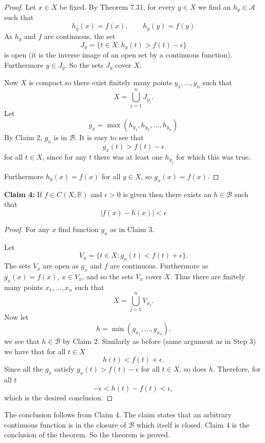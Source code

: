 \documentclass[12pt]{book}
\newcommand{\abs}[1]{\left\lvert {#1} \right\rvert}
\newcommand{\R}{{\mathbb{R}}}
\newcommand{\sA}{{\mathcal{A}}}
\newcommand{\sB}{{\mathcal{B}}}
\theoremstyle{plain}
\theoremstyle{remark}
\theoremstyle{definition}
\theoremstyle{exercise}
\theoremstyle{example}
\begin{document}
\begin{proof}
Let $x \in X$ be fixed.
By Theorem 7.31, for every $y \in X$ we find an $h_y \in
\sA$ such that
$$
h_y(x) = f(x), \qquad h_y(y)=f(y)
$$
As $h_y$ and $f$ are continuous, the set
$$
J_y = \{ t \in X : h_y(t) > f(t) -\epsilon \}
$$
is open (it is the inverse image of an open set by a continuous function).
Furthermore $y \in J_y$.  So the sets $J_y$ cover $X$.

Now $X$ is compact so there exist finitely many points $y_1,\ldots,y_n$ such
that
$$
X = \bigcup_{j=1}^n J_{y_j}  .
$$
Let 
$$
g_x = \max(h_{y_1},h_{y_2},\ldots,h_{y_n})
$$
By Claim 2, $g_x$ is in $\sB$.
It is easy to see that
$$
g_x(t) > f(t) -\epsilon
$$
for all $t \in X$, since for any $t$ there was at least one $h_{y_j}$ for
which this was true.

Furthermore $h_y(x) = f(x)$ for all $y \in X$, so
$g_x(x) = f(x)$.
\end{proof}

\medskip

\textbf{Claim 4:} If $f \in C(X,\R)$ and $\epsilon > 0$ is given then there
exists an $h \in \sB$ such that
$$
\abs{f(x) - h(x)} < \epsilon
$$

\begin{proof}
For any $x$ find function $g_x$ as in Claim 3.

Let
$$
V_x = \{ t \in X : g_x(t) < f(t) + \epsilon \}.
$$
The sets $V_x$ are open as $g_x$ and $f$ are continuous.
Furthermore as $g_x(x) = f(x)$, $x \in V_x$, and so the sets $V_x$ cover $X$.  Thus
there
are finitely many points $x_1,\ldots,x_n$ such that
$$
X = \bigcup_{j=1}^n V_{x_j} .
$$
Now let
$$
h = \min(g_{x_1},\ldots,g_{x_n}) .
$$
we see that $h \in \sB$ by Claim 2.  Similarly as before (same argument as in
Step 3) we have that for all
$t \in X$
\begin{equation*}
h(t) < f(t) + \epsilon .
\end{equation*}
Since all the $g_x$ satisfy $g_x(t) > f(t) - \epsilon$ for all $t \in X$, so does $h$.
Therefore, for all $t$
\begin{equation*}
-\epsilon < h(t) - f(t) < \epsilon ,
\end{equation*}
which is the desired conclusion.
\end{proof}

The conclusion follows from Claim 4.  The claim states that an
arbitrary continuous function is in the closure of $\sB$ which itself is
closed.
Claim 4 is the conclusion of the theorem.  So the theorem is proved.
\end{document}
